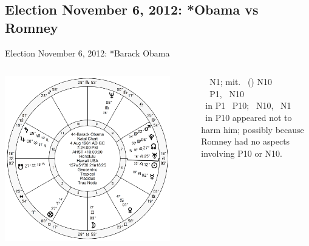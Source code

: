 \subsection{Election November 6, 2012: *Obama vs Romney}
\begin{frame}[t]{Election November 6, 2012: *Barack Obama}
\small

\begin{columns}[T, onlytextwidth]
\vspace{-1em}
{\includegraphics[width=0.9\textwidth]{charts/Obama.png}}
\fontsize{7pt}{8pt}\selectfont

\Venus\, \Trine\, N1; mit. \Quincunx\, (\Opposition) N10 \\
\Saturn\, \Trine\, P1, \Sextile\, N10 \\
\Moon\, in P1 \Square\, P10; \Opposition\, N10, \Square\, N1 \\
\vspace{0.5em}
\SouthNode\, in P10 appeared not to harm him; possibly because Romney had no aspects involving P10 or N10.


\end{columns}
\end{frame}
